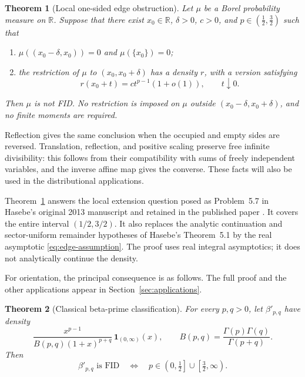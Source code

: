 \documentclass[11pt,a4paper]{article}
\newtheorem{theorem}{Theorem}[section]
\theoremstyle{definition}
\theoremstyle{remark}
\newcommand{\R}{\mathbb R}
\newcommand{\Bad}{\left(\tfrac12,\tfrac32\right)}
\newcommand{\Good}{\left(0,\tfrac12\right]\cup\left[\tfrac32,\infty\right)}
\begin{document}
\begin{theorem}[Local one-sided edge obstruction]\label{thm:edge}
Let $\mu$ be a Borel probability measure on $\R$. Suppose that there
exist $x_0\in\R$, $\delta>0$, $c>0$, and $p\in\Bad$ such that
\begin{enumerate}[label=\textup{(\roman*)}]
\item $\mu((x_0-\delta,x_0))=0$ and $\mu(\{x_0\})=0$;
\item the restriction of $\mu$ to $(x_0,x_0+\delta)$ has a density
$r$, with a version satisfying
\begin{equation}\label{eq:edge-assumption}
 r(x_0+t)=ct^{p-1}(1+o(1)),\qquad t\downarrow0.
\end{equation}
\end{enumerate}
Then $\mu$ is not FID. No restriction is imposed on $\mu$ outside
$(x_0-\delta,x_0+\delta)$, and no finite moments are required.
\end{theorem}

Reflection gives the same conclusion when the occupied and empty
sides are reversed. Translation, reflection, and positive scaling
preserve free infinite divisibility: this follows from their
compatibility with sums of freely independent variables, and the
inverse affine map gives the converse. These facts will also be used
in the distributional applications.

Theorem~\ref{thm:edge} answers the local extension question posed as
Problem~5.7 in Hasebe's original 2013 manuscript
\cite{Hasebe2013} and retained in the published paper
\cite{Hasebe2014}. It covers the entire interval $(1/2,3/2)$.
It also replaces the analytic continuation and sector-uniform
remainder hypotheses of Hasebe's Theorem~5.1 by the real asymptotic
\eqref{eq:edge-assumption}. The proof uses real integral asymptotics;
it does not analytically continue the density.

For orientation, the principal consequence is as follows. The full
proof and the other applications appear in Section~\ref{sec:applications}.

\begin{theorem}[Classical beta-prime classification]\label{thm:bp-main}
For every $p,q>0$, let $\beta'_{p,q}$ have density
\begin{equation}\label{eq:bp-density}
 \frac{x^{p-1}}{B(p,q)(1+x)^{p+q}}\,\mathbf1_{(0,\infty)}(x),
 \qquad B(p,q)=\frac{\Gamma(p)\Gamma(q)}{\Gamma(p+q)}.
\end{equation}
Then
\begin{equation}\label{eq:bp-classification}
 \beta'_{p,q}\text{ is FID}
 \quad\Longleftrightarrow\quad
 p\in\Good.
\end{equation}
\end{theorem}
\end{document}
